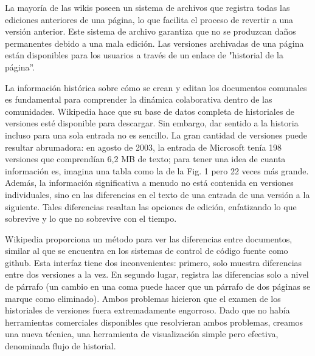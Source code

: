 
La mayoría de las wikis poseen un sistema de archivos que registra todas las ediciones anteriores de una página, lo que facilita el proceso de revertir a una versión anterior. Este sistema de archivo garantiza que no se produzcan daños permanentes debido a una mala edición. Las versiones archivadas de una página están disponibles para los usuarios a través de un enlace de "historial de la página”.

La información histórica sobre cómo se crean y editan los documentos comunales es fundamental para comprender la dinámica colaborativa dentro de las comunidades. Wikipedia hace que su base de datos completa de historiales de versiones esté disponible para descargar. Sin embargo, dar sentido a la historia incluso para una sola entrada no es sencillo. La gran cantidad de versiones puede resultar abrumadora: en agosto de 2003, la entrada de Microsoft tenía 198 versiones que comprendían 6,2 MB de texto; para tener una idea de cuanta información es, imagina una tabla como la de la Fig. 1 pero 22 veces más grande. Además, la información significativa a menudo no está contenida en versiones individuales, sino en las diferencias en el texto de una entrada de una versión a la siguiente. Tales diferencias resaltan las opciones de edición, enfatizando lo que sobrevive y lo que no sobrevive con el tiempo.

Wikipedia proporciona un método para ver las diferencias entre documentos, similar al que se encuentra en los sistemas de control de código fuente como github. Esta interfaz tiene dos inconvenientes: primero, solo muestra diferencias entre dos versiones a la vez. En segundo lugar, registra las diferencias solo a nivel de párrafo (un cambio en una coma puede hacer que un párrafo de dos páginas se marque como eliminado). Ambos problemas hicieron que el examen de los historiales de versiones fuera extremadamente engorroso. Dado que no había herramientas comerciales disponibles que resolvieran ambos problemas, creamos una nueva técnica, una herramienta de visualización simple pero efectiva, denominada flujo de historial.